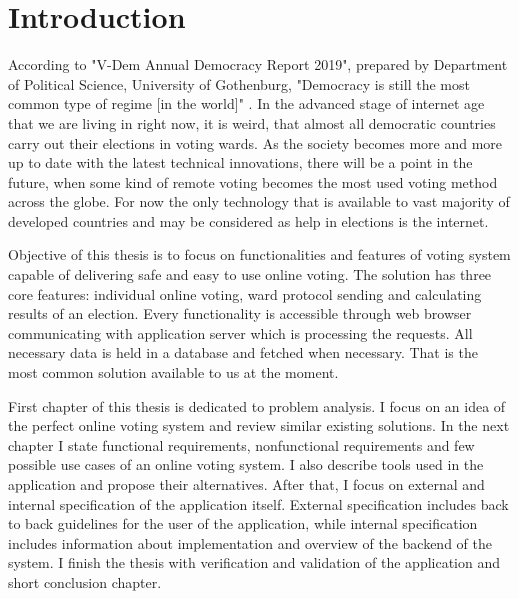 \documentclass[a4paper,twoside,12pt]{book}
\newcounter{PagesWithoutNumbers}
\begin{document}
\vfill
 
 

\cleardoublepage


\pagestyle{onlyPageNumbers}
\tableofcontents

\setcounter{PagesWithoutNumbers}{\value{page}}
\mainmatter
\pagestyle{PageNumbersChapterTitles}



\chapter{Introduction}
  According to "V-Dem Annual Democracy Report 2019", prepared by Department of Political Science, University of Gothenburg,
  "Democracy is still the most common type of regime [in the world]" \cite{bib:v-dem_report}.
  In the advanced stage of internet age that we are living in right now, it is weird, that almost all democratic countries carry out their elections in voting wards.
  As the society becomes more and more up to date with the latest technical innovations, there will be a point in the future, 
  when some kind of remote voting becomes the most used voting method across the globe.
  For now the only technology that is available to vast majority of developed countries and may be considered as help in elections is the internet. 

  Objective of this thesis is to focus on functionalities and features of voting system capable of delivering safe and easy to use online voting.
  The solution has three core features: individual online voting, ward protocol sending and calculating results of an election.
  Every functionality is accessible through web browser communicating with application server which is processing the requests.
  All necessary data is held in a database and fetched when necessary.
  That is the most common solution available to us at the moment.

  First chapter of this thesis is dedicated to problem analysis. I focus on an idea of the perfect online voting system and review similar existing solutions.
  In the next chapter I state functional requirements, nonfunctional requirements and few possible use cases of an online voting system. 
  I also describe tools used in the application and propose their alternatives.
  After that, I focus on external and internal specification of the application itself. 
  External specification includes back to back guidelines for the user of the application, while internal specification includes information about implementation and overview of the backend of the system.
  I finish the thesis with verification and validation of the application and short conclusion chapter.
\end{document}
